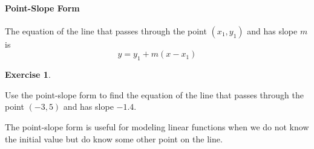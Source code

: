 \documentclass[10pt,]{book}
\theoremstyle{plain}
\theoremstyle{definition}
\newtheorem{exercise}[theorem]{Exercise}
\theoremstyle{definition}
\numberwithin{equation}{section}
\newcounter{figstack}
\newcounter{figindex}
\newlength\fight
\newcommand\pushValignCaptionBottom[5][b]{%
\stepcounter{figstack}%
\expandafter\def\csname %
figalign\romannumeral\value{figstack}\endcsname{#1}%
\expandafter\def\csname %
figtype\romannumeral\value{figstack}\endcsname{#2}%
\expandafter\def\csname %
figwd\romannumeral\value{figstack}\endcsname{#3}%
\expandafter\def\csname %
figcontent\romannumeral\value{figstack}\endcsname{#4}%
\expandafter\def\csname %
figcap\romannumeral\value{figstack}\endcsname{#5}%
\setbox0=\hbox{%
\begin{#2}{#3}#4\end{#2}}%
\ifdim\dimexpr\ht0+\dp0\relax>\fight\global\setlength{\fight}{%
\dimexpr\ht0+\dp0\relax}\fi%
}
\newcommand\popValignCaptionBottom{%
\setcounter{figindex}{0}%
\hfill%
\whiledo{\value{figindex}<\value{figstack}}{%
\stepcounter{figindex}%
\def\tmp{\csname figwd\romannumeral\value{figindex}\endcsname}%
\begin{\csname figtype\romannumeral\value{figindex}\endcsname}[t]{\tmp}%
\centering%
\stackinset{c}{}%
{\csname figalign\romannumeral\value{figindex}\endcsname}{}%
{\csname figcontent\romannumeral\value{figindex}\endcsname}%
{\rule{0pt}{\fight}}\par%
\csname figcap\romannumeral\value{figindex}\endcsname%
\end{\csname figtype\romannumeral\value{figindex}\endcsname}%
\hfill%
}%
\setcounter{figstack}{0}%
\setlength{\fight}{0pt}%
\hfill%
}
\begin{document}
\paragraph[Point-Slope Form]{Point-Slope Form}\label{paragraphs-16}

    The equation of the line that passes through the point \((x_1, y_1)\) and has slope \(m\) is
    \begin{equation*}y= y_1 + m(x− x_1)\end{equation*}
%
\begin{exercise}\label{exercise-point-slope}

    Use the point-slope form to find the equation of the line that passes through the point \((−3, 5)\) and has slope \(−1.4\).
    \leavevmode%
\end{exercise}
\par
The point-slope form is useful for modeling linear functions when we do not know the
initial value but do know some other point on the line.%
\end{document}
